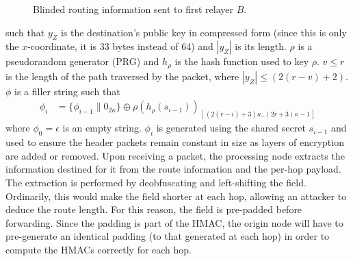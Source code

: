 \begin{figure}[H]
    \caption{Blinded routing information sent to first relayer $B$.}
\end{figure}

such that $y_Z$ is the destination's public key in compressed form (since this is only the $x$-coordinate, it is 33 bytes instead of 64) and $|y_Z|$ is its length. $\rho$ is a pseudorandom generator (PRG) and $h_{\rho}$ is the hash function used to key $\rho$.
$v\leq r$ is the length of the path traversed by the packet, where $|y_Z| \leq (2(r - v) + 2)$. $\phi$ is a filler string such that
\begin{align}
    \phi_i & =\{ \phi_{i-1}\|0_{2\kappa}\}\oplus \rho(h_{\rho}(s_{i-1}))_{[ \,(2(r-i)+3)\kappa..(2r+3)\kappa-1\,]}
\end{align}
where $\phi_0=\epsilon$ is an empty string. $\phi_i$ is generated using the shared secret $s_{i-1}$ and used to ensure the header packets remain constant in size as layers of encryption are added or removed. Upon receiving a packet, the processing node extracts the information destined for it from the route information and the per-hop payload. The extraction is performed by deobfuscating and left-shifting the field. Ordinarily, this would make the field shorter at each hop, allowing an attacker to deduce the route length. For this reason, the field is pre-padded before forwarding. Since the padding is part of the HMAC, the origin node will have to pre-generate an identical padding (to that generated at each hop) in order to compute the HMACs correctly for each hop.

